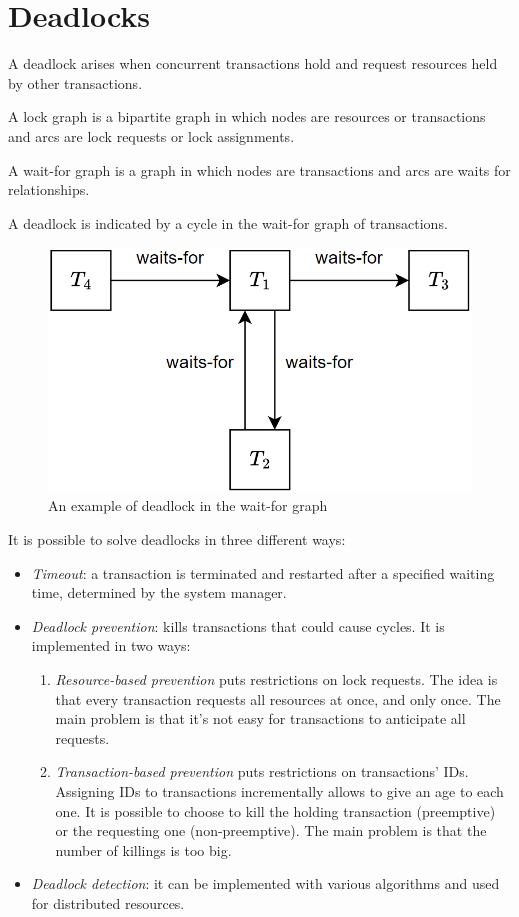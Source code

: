 \section{Deadlocks}

A deadlock arises when concurrent transactions hold and request resources held by other transactions.
\begin{definition}
    A lock graph is a bipartite graph in which nodes are resources or transactions and arcs are lock requests or lock assignments. 
\end{definition}
\begin{definition}
    A wait-for graph is a graph in which nodes are transactions and arcs are waits for relationships. 
\end{definition}
A deadlock is indicated by a cycle in the wait-for graph of transactions.
\begin{figure}[H]
    \centering
    \includegraphics[width=0.35\linewidth]{images/waitgraph.png}
    \caption{An example of deadlock in the wait-for graph}
\end{figure}
It is possible to solve deadlocks in three different ways: 
\begin{itemize}
    \item \textit{Timeout}: a transaction is terminated and restarted after a specified waiting time, determined by the system manager.
    \item \textit{Deadlock prevention}: kills transactions that could cause cycles. 
        It is implemented in two ways: 
        \begin{enumerate}
            \item \textit{Resource-based prevention} puts restrictions on lock requests. 
                The idea is that every transaction requests all resources at once, and only once. 
                The main problem is that it's not easy for transactions to anticipate all requests. 
            \item \textit{Transaction-based prevention} puts restrictions on transactions' IDs. 
                Assigning IDs to transactions incrementally allows to give an age to each one. 
                It is possible to choose to kill the holding transaction (preemptive) or the requesting one (non-preemptive). 
                The main problem is that the number of killings is too big. 
        \end{enumerate}
    \item \textit{Deadlock detection}: it can be implemented with various algorithms and used for distributed resources. 
\end{itemize}


